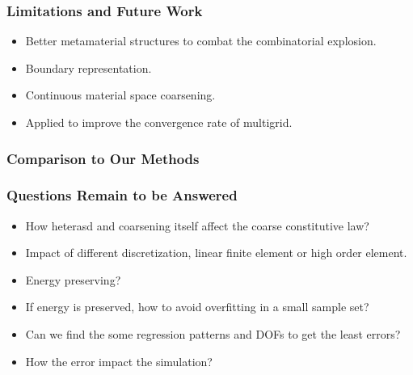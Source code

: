 \documentclass[serif,mathserif]{beamer}
\begin{document}
\begin{frame}
  \frametitle{Limitations and Future Work}
  \begin{itemize}
  \item Better metamaterial structures to combat the combinatorial explosion.
  \item Boundary representation.
  \item Continuous material space coarsening.
  \item Applied to improve the convergence rate of multigrid.
  \end{itemize}
\end{frame}

\begin{frame}
  \frametitle{Comparison to Our Methods}
  
\end{frame}

\begin{frame}
  \frametitle{Questions Remain to be Answered}
  \begin{itemize}
  \item How heterasd and coarsening itself affect the coarse constitutive law?
  \item Impact of different discretization, linear finite element or high order element.
  \item Energy preserving?
  \item If energy is preserved, how to avoid overfitting in a small sample set?
  \item Can we find the some regression patterns and DOFs to get the least errors?
  \item How the error impact the simulation?
  \end{itemize}
\end{frame}

\begin{frame} 
\end{frame}
\end{document}
